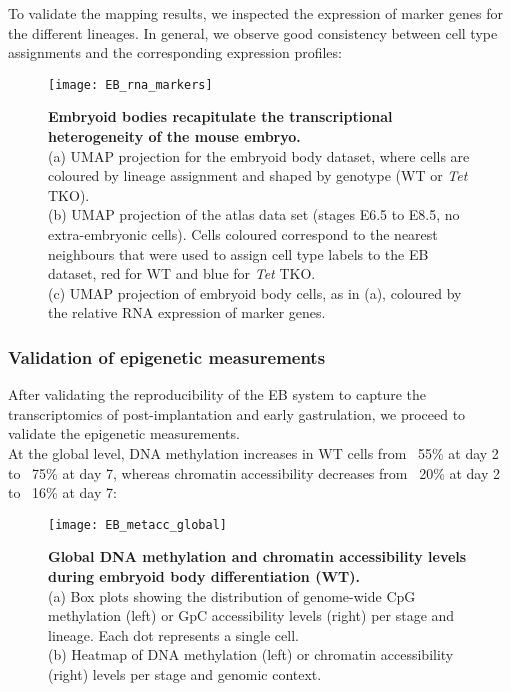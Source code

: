 To validate the mapping results, we inspected the expression of marker genes for the different lineages. In general, we observe good consistency between cell type assignments and the corresponding expression profiles:

\begin{figure}[H]
	\centering
	\texttt{[image: EB\_rna\_markers]}
	\caption[]{
	\textbf{Embryoid bodies recapitulate the transcriptional heterogeneity of the mouse embryo.}\\
	(a) UMAP projection for the embryoid body dataset, where cells are coloured by lineage assignment and shaped by genotype (WT or \textit{Tet} TKO).\\
	(b) UMAP projection of the atlas data set (stages E6.5 to E8.5, no extra-embryonic cells). Cells coloured correspond to the nearest neighbours that were used to assign cell type labels to the EB dataset, red for WT and blue for \textit{Tet} TKO.\\
	(c) UMAP projection of embryoid body cells, as in (a), coloured by the relative RNA expression of marker genes. 
	}
	\label{fig:EB_rna_markers}
\end{figure}



\subsubsection{Validation of epigenetic measurements}

After validating the reproducibility of the EB system to capture the transcriptomics of post-implantation and early gastrulation, we proceed to validate the epigenetic measurements.\\
At the global level, DNA methylation increases in WT cells from ~55\% at day 2 to ~75\% at day 7, whereas chromatin accessibility decreases from ~20\% at day 2 to ~16\% at day 7:

\begin{figure}[H]
	\centering
	\texttt{[image: EB\_metacc\_global]}
	\caption[]{
	\textbf{Global DNA methylation and chromatin accessibility levels during embryoid body differentiation (WT).}\\
	(a) Box plots showing the distribution of genome-wide CpG methylation (left) or GpC accessibility levels (right) per stage and lineage. Each dot represents a single cell. \\
	(b) Heatmap of DNA methylation (left) or chromatin accessibility (right) levels per stage and genomic context.
	}
	\label{fig:EB_metacc_global}
\end{figure}

